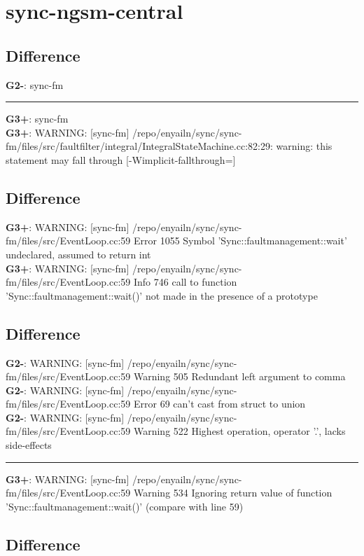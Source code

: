 \documentclass[12pt,twoside]{article}
\begin{document}
\section{sync-ngsm-central} 
\subsection{Difference} 
\textbf{G2-}: sync-fm 
\rule{\textwidth}{0.5pt} 
\textbf{G3+}: sync-fm\\ 
\textbf{G3+}: WARNING: [sync-fm] /repo/enyailn/sync/sync-fm/files/src/faultfilter/integral/IntegralStateMachine.cc:82:29: warning: this statement may fall through [-Wimplicit-fallthrough=]\\ 
\subsection{Difference} 
\textbf{G3+}: WARNING: [sync-fm] /repo/enyailn/sync/sync-fm/files/src/EventLoop.cc:59 Error 1055 Symbol 'Sync::faultmanagement::wait' undeclared, assumed to return int\\ 
\textbf{G3+}: WARNING: [sync-fm] /repo/enyailn/sync/sync-fm/files/src/EventLoop.cc:59 Info 746 call to function 'Sync::faultmanagement::wait()' not made in the presence of a prototype\\ 
\subsection{Difference} 
\textbf{G2-}: WARNING: [sync-fm] /repo/enyailn/sync/sync-fm/files/src/EventLoop.cc:59 Warning 505 Redundant left argument to comma\\ 
\textbf{G2-}: WARNING: [sync-fm] /repo/enyailn/sync/sync-fm/files/src/EventLoop.cc:59 Error 69 can't cast from struct to union\\ 
\textbf{G2-}: WARNING: [sync-fm] /repo/enyailn/sync/sync-fm/files/src/EventLoop.cc:59 Warning 522 Highest operation, operator '.', lacks side-effects\\ 
\rule{\textwidth}{0.5pt} 
\textbf{G3+}: WARNING: [sync-fm] /repo/enyailn/sync/sync-fm/files/src/EventLoop.cc:59 Warning 534 Ignoring return value of function 'Sync::faultmanagement::wait()' (compare with line 59)\\ 
\subsection{Difference} 
  
\end{document}
